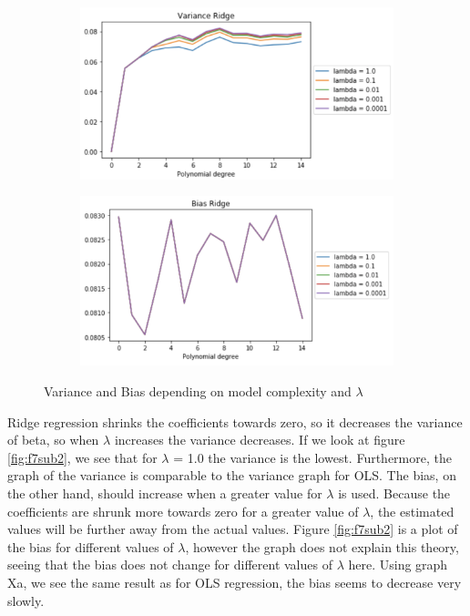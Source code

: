 \documentclass[12pt]{extarticle}
\begin{document}
\begin{figure}
    \centering
    \begin{subfigure}{.5\textwidth}
        \centering
        \includegraphics[width=.95\linewidth]{10}
        \label{fig:f9sub1}
    \end{subfigure}%
    \begin{subfigure}{.5\textwidth}
        \centering
        \includegraphics[width=.95\linewidth]{11}
        \label{fig:f9sub2}
    \end{subfigure}
    \caption{Variance and Bias depending on model complexity and $\lambda$}
    \label{fig:f9}
\end{figure}

Ridge regression shrinks the coefficients towards zero, so it decreases the variance of beta, so when $\lambda$ increases the variance decreases. If we look at figure \ref{fig:f7sub2}, we see that for $\lambda$ = 1.0 the variance is the lowest. Furthermore, the graph of the variance is comparable to the variance graph for OLS.  The bias, on the other hand, should increase when a greater value for $\lambda$ is used. Because the coefficients are shrunk more towards zero for a greater value of $\lambda$, the estimated values will be further away from the actual values. Figure \ref{fig:f7sub2} is a plot of the bias for different values of $\lambda$, however the graph does not explain this theory, seeing that the bias does not change for different values of $\lambda$ here. Using graph Xa, we see the same result as for OLS regression, the bias seems to decrease very slowly.
\end{document}
